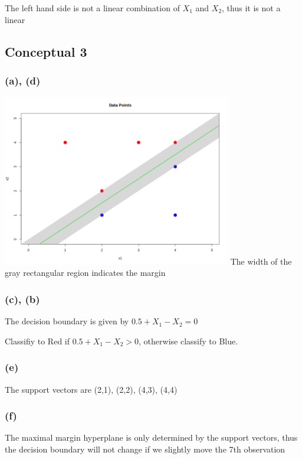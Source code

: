 \documentclass{article}
\begin{document}
The left hand side is not a linear combination of $X_1$ and $X_2$, thus it is not a linear

\newpage
\subsection{Conceptual 3}
\subsubsection*{(a), (d)}

\includegraphics[width=0.75\textwidth]{figs/q3-1.png}
\newline
The width of the gray rectangular region indicates the margin

\subsubsection*{(c), (b)}
The decision boundary is given by \(0.5 + X_1 - X_2 = 0\)

Classifiy to Red if \(0.5 + X_1 - X_2 > 0\), otherwise classify to Blue. 

\subsubsection*{(e)}
The support vectors are (2,1), (2,2), (4,3), (4,4)
\subsubsection*{(f)}
The maximal margin hyperplane is only determined by the support vectors, thus the decision boundary will not change if we slightly move the 7th observation
\end{document}
